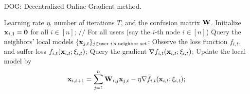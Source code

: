 \documentclass{article}
\begin{document}
\begin{algorithm}[!]
   \caption{\textsc{DOG}: Decentralized Online Gradient method.}
   \label{algo_DOG}
   \begin{algorithmic}[1]
   \Require Learning rate $\eta$, number of iterations $T$, and the confusion matrix ${\bf W}$.    
  \State Initialize ${\bf x}_{i,1} = {\bf 0}$ for all $i\in [n]$;    
            \State $\slash\slash$ For all users (say the $i$-th node $i\in[n]$)
                        \State \indent Query the neighbors' local models $\{{\bf x}_{j,t}\}_{j\in \text{user $i$'s neighbor set}}$;
            \State \indent Observe the loss function $f_{i,t}$, and suffer loss $f_{i,t}({\bf x}_{i,t};\xi_{i,t})$;
            \State \indent Query the gradient $\nabla f_{i,t}({\bf x}_{i,t};\xi_{i,t})$;
            \State \indent Update the local model by 
            \[{\bf x}_{i,t+1} = \sum_{j=1}^n {\bf W}_{i,j}{\bf x}_{j,t} - \eta \nabla f_{i,t}({\bf x}_{i,t};\xi_{i,t});\]
       \EndFor
   \end{algorithmic}
\end{algorithm}
\end{document}
